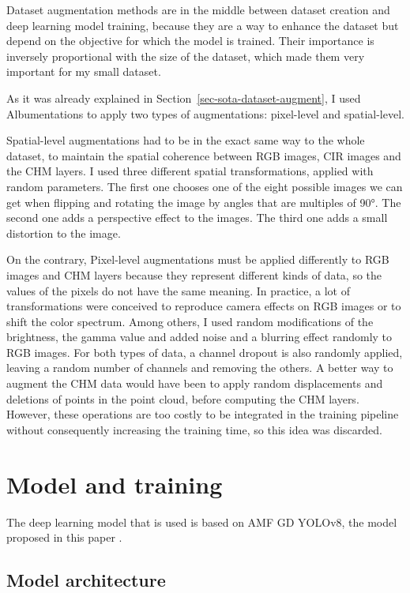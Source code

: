 \documentclass[
  letterpaper,
  DIV=11,
  numbers=noendperiod]{scrartcl}
\begin{document}
Dataset augmentation methods are in the middle between dataset creation
and deep learning model training, because they are a way to enhance the
dataset but depend on the objective for which the model is trained.
Their importance is inversely proportional with the size of the dataset,
which made them very important for my small dataset.

As it was already explained in Section~\ref{sec-sota-dataset-augment}, I
used Albumentations \autocite{albumentations} to apply two types of
augmentations: pixel-level and spatial-level.

Spatial-level augmentations had to be in the exact same way to the whole
dataset, to maintain the spatial coherence between RGB images, CIR
images and the CHM layers. I used three different spatial
transformations, applied with random parameters. The first one chooses
one of the eight possible images we can get when flipping and rotating
the image by angles that are multiples of 90°. The second one adds a
perspective effect to the images. The third one adds a small distortion
to the image.

On the contrary, Pixel-level augmentations must be applied differently
to RGB images and CHM layers because they represent different kinds of
data, so the values of the pixels do not have the same meaning. In
practice, a lot of transformations were conceived to reproduce camera
effects on RGB images or to shift the color spectrum. Among others, I
used random modifications of the brightness, the gamma value and added
noise and a blurring effect randomly to RGB images. For both types of
data, a channel dropout is also randomly applied, leaving a random
number of channels and removing the others. A better way to augment the
CHM data would have been to apply random displacements and deletions of
points in the point cloud, before computing the CHM layers. However,
these operations are too costly to be integrated in the training
pipeline without consequently increasing the training time, so this idea
was discarded.

\section{Model and training}\label{model-and-training}

The deep learning model that is used is based on AMF GD YOLOv8, the
model proposed in this paper \autocite{amf_gd_yolov8}.

\subsection{Model architecture}\label{model-architecture}
\end{document}

